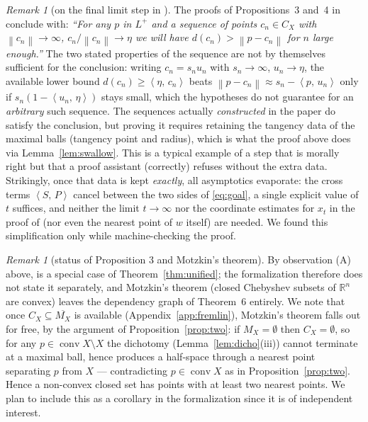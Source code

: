 \documentclass[11pt]{article}
\theoremstyle{remark}
\newtheorem{remark}[theorem]{Remark}
\newcommand{\R}{\mathbb{R}}
\newcommand{\X}{X}
\newcommand{\conv}{\operatorname{conv}}
\newcommand{\sca}[2]{\left\langle #1,\, #2\right\rangle}
\newcommand{\norm}[1]{\left\lVert #1\right\rVert}
\newcommand{\Mx}{M_{\X}}
\newcommand{\Cx}{C_{\X}}
\begin{document}
\begin{remark}[on the final limit step in \cite{Bia}]\label{rem:swallow}
The proofs of Propositions~3 and~4 in \cite{Bia} conclude with: \emph{``For any $p$ in $L^{+}$
and a sequence of points $c_n\in\Cx$ with $\norm{c_n}\to\infty$, $c_n/\norm{c_n}\to\eta$ we will
have $d(c_n)>\norm{p-c_n}$ for $n$ large enough.''} The two stated properties of the sequence
are not by themselves sufficient for the conclusion: writing $c_n=s_nu_n$ with $s_n\to\infty$,
$u_n\to\eta$, the available lower bound $d(c_n)\ge\sca{\eta}{c_n}$ beats
$\norm{p-c_n}\approx s_n-\sca{p}{u_n}$ only if $s_n(1-\sca{u_n}{\eta})$ stays small, which the
hypotheses do not guarantee for an \emph{arbitrary} such sequence. The sequences actually
\emph{constructed} in the paper do satisfy the conclusion, but proving it requires retaining the
tangency data of the maximal balls (tangency point and radius), which is what the proof above
does via Lemma~\ref{lem:swallow}. This is a typical example of a step that is morally right but
that a proof assistant (correctly) refuses without the extra data. Strikingly, once that data is
kept \emph{exactly}, all asymptotics evaporate: the cross terms $\sca{S}{P}$ cancel between the
two sides of \eqref{eq:goal}, a single explicit value of $t$ suffices, and neither the limit
$t\to\infty$ nor the coordinate estimates for $x_t$ in the proof of \cite[Proposition~4]{Bia}
(nor even the nearest point of $w$ itself) are needed. We found this simplification only while
machine-checking the proof.
\end{remark}

\begin{remark}[status of Proposition 3 and Motzkin's theorem]\label{rem:motzkin}
By observation (A) above, \cite[Proposition~3]{Bia} is a special case of
Theorem~\ref{thm:unified}; the formalization therefore does not state it separately, and
Motzkin's theorem (closed Chebyshev subsets of $\R^n$ are convex) leaves the dependency graph of
Theorem~6 entirely. We note that once $\Cx\subseteq\overline{\Mx}$ is available
(Appendix~\ref{app:fremlin}), Motzkin's theorem falls out for free, by the argument of
Proposition~\ref{prop:two}: if $\Mx=\emptyset$ then $\Cx=\emptyset$, so for any
$p\in\conv\X\setminus\X$ the dichotomy (Lemma~\ref{lem:dicho}(iii)) cannot terminate at a maximal
ball, hence produces a half-space through a nearest point separating $p$ from $\X$ ---
contradicting $p\in\conv \X$ as in Proposition~\ref{prop:two}. Hence a non-convex closed set has
points with at least two nearest points. We plan to include this as a corollary in the
formalization since it is of independent interest.
\end{remark}
\end{document}
